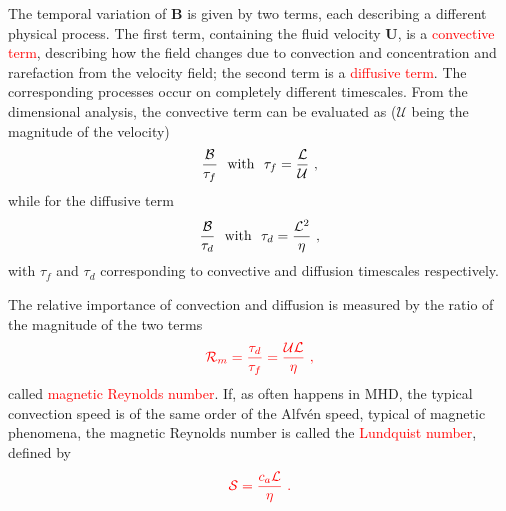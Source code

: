 \documentclass[12pt,a4paper]{article}
\renewcommand{\vec}[1]{\boldsymbol{#1}}
\begin{document}
The temporal variation of $\vec{B}$ is given by two terms, each describing a different physical process. The first term, containing the fluid velocity $\vec{U}$, is a \textcolor{red}{convective term}, describing how the field changes due to convection and concentration and rarefaction from the velocity field; the second term is a \textcolor{red}{diffusive term}. The corresponding processes occur on completely different timescales. From the dimensional analysis, the convective term can be evaluated as ($\mathcal U$ being the magnitude of the velocity)
\begin{equation*}
\frac{\mathcal B}{\tau_f} ~~{\rm with } ~~ \tau_f = \frac{\mathcal L}{\mathcal U} ~,
\end{equation*}
while for the diffusive term
\begin{equation*}
\frac{\mathcal B}{\tau_d} ~~{\rm with } ~~ \tau_d = \frac{\mathcal L^2 }{\eta} ~,
\end{equation*}
with $\tau_f$ and $\tau_d$ corresponding to convective and diffusion timescales respectively. 

The relative importance of convection and diffusion is measured by the ratio of the magnitude of the two terms
\begin{equation}
\color{red} \mathcal R_{m} = \frac{\tau_d}{\tau_f} =  \frac{\mathcal {U L}}{\eta} ~,
\end{equation}
called \textcolor{red}{magnetic Reynolds number}. If, as often happens in MHD, the typical convection speed is of the same order of the Alfv\'en speed, typical of magnetic phenomena, the magnetic Reynolds number is called the  \textcolor{red}{Lundquist number}, defined by
\begin{equation}
\color{red} \mathcal S =  \frac{c_a \mathcal  L}{\eta} ~.
\end{equation}
\end{document}
